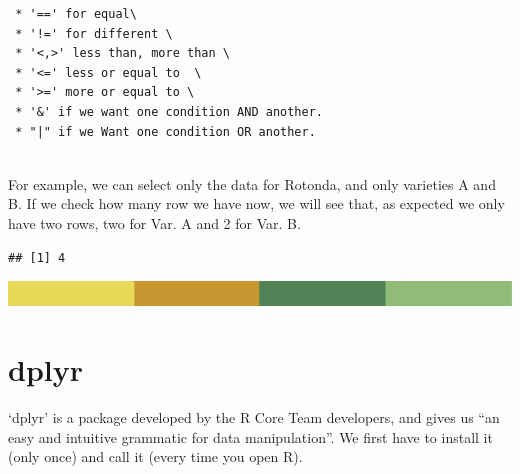 \documentclass[
]{book}
\newenvironment{Shaded}{\begin{snugshade}}{\end{snugshade}}
\newcommand{\CommentTok}[1]{\textcolor[rgb]{0.56,0.35,0.01}{\textit{#1}}}
\newcommand{\FunctionTok}[1]{\textcolor[rgb]{0.00,0.00,0.00}{#1}}
\newcommand{\NormalTok}[1]{#1}
\newcommand{\OtherTok}[1]{\textcolor[rgb]{0.56,0.35,0.01}{#1}}
\newcommand{\SpecialCharTok}[1]{\textcolor[rgb]{0.00,0.00,0.00}{#1}}
\newcommand{\StringTok}[1]{\textcolor[rgb]{0.31,0.60,0.02}{#1}}
\begin{document}
\begin{verbatim}
 * '==' for equal\
 * '!=' for different \
 * '<,>' less than, more than \
 * '<=' less or equal to  \
 * '>=' more or equal to \
 * '&' if we want one condition AND another.
 * "|" if we Want one condition OR another. 
 
\end{verbatim}

For example, we can select only the data for Rotonda, and only varieties A and B. If we check how many row we have now, we will see that, as expected we only have two rows, two for Var. A and 2 for Var. B.

\begin{Shaded}
\end{Shaded}

\begin{verbatim}
## [1] 4
\end{verbatim}

\includegraphics{rsrstrip.png}

\hypertarget{dplyr}{%
\section{dplyr}\label{dplyr}}

`dplyr' is a package developed by the R Core Team developers, and gives us ``an easy and intuitive grammatic for data manipulation''. We first have to install it (only once) and call it (every time you open R).
\end{document}
